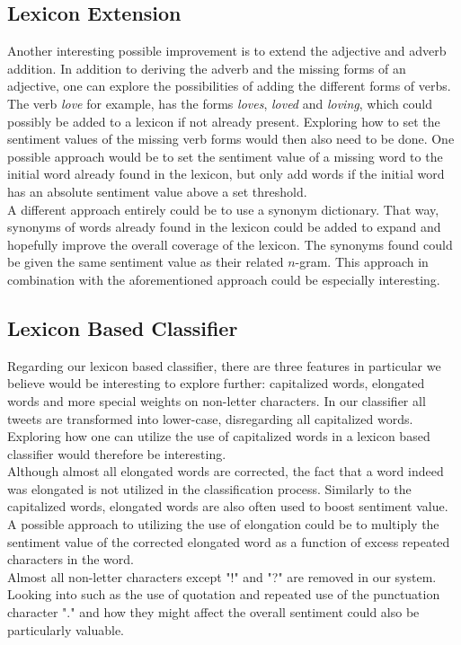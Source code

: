 \subsection{Lexicon Extension}
Another interesting possible improvement is to extend the adjective and adverb addition. In addition to deriving the adverb and the missing forms of an adjective, one can explore the possibilities of adding the different forms of verbs. The verb \textit{love} for example, has the forms \textit{loves}, \textit{loved} and \textit{loving}, which could possibly be added to a lexicon if not already present. Exploring how to set the sentiment values of the missing verb forms would then also need to be done. One possible approach would be to set the sentiment value of a missing word to the initial word already found in the lexicon, but only add words if the initial word has an absolute sentiment value above a set threshold. \\

A different approach entirely could be to use a synonym dictionary. That way, synonyms of words already found in the lexicon could be added to expand and hopefully improve the overall coverage of the lexicon. The synonyms found could be given the same sentiment value as their related $n$-gram. This approach in combination with the aforementioned approach could be especially interesting.\\

\subsection{Lexicon Based Classifier}
Regarding our lexicon based classifier, there are three features in particular we believe would be interesting to explore further: capitalized words, elongated words and more special weights on non-letter characters. In our classifier all tweets are transformed into lower-case, disregarding all capitalized words. Exploring how one can utilize the use of capitalized words in a lexicon based classifier would therefore be interesting. \\

Although almost all elongated words are corrected, the fact that a word indeed was elongated is not utilized in the classification process. Similarly to the capitalized words, elongated words are also often used to boost sentiment value. A possible approach to utilizing the use of elongation could be to multiply the sentiment value of the corrected elongated word as a function of excess repeated characters in the word. \\

Almost all non-letter characters except "!" and "?" are removed in our system. Looking into such as the use of quotation and repeated use of the punctuation character "." and how they might affect the overall sentiment could also be particularly valuable. 

\glsresetall